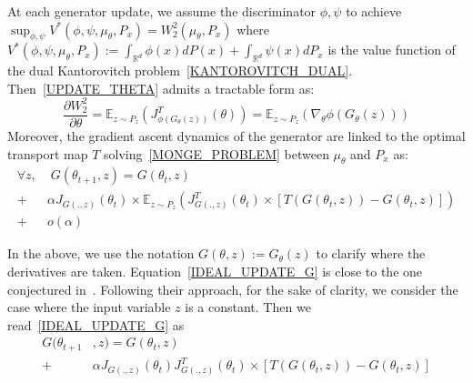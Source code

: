 \documentclass[runningheads]{llncs}
\newcommand\mycitet[1]{\cite{#1}}
\begin{document}
\begin{proposition}\label{prop:dynamic}
\normalfont At each generator update, we assume the discriminator $\phi,\psi$ to achieve $\sup_{\phi,\psi} V^*(\phi,\psi,\mu_\theta,P_x)=W_2^2(\mu_\theta,P_x)$ where $V^*(\phi,\psi,\mu_\theta,P_x):= \int_{\mathds{R}^d} \phi(x)dP(x) + \int_{\mathds{R}^d} \psi(x)dP_x$ is the value function of the dual Kantorovitch problem~\eqref{KANTOROVITCH_DUAL}. Then~\eqref{UPDATE_THETA} admits a tractable form as:
\[\frac{\partial{ W_2^2}}{\partial \theta}= \mathds{E}_{z \sim P_z}(J_{\phi(G_\theta(z))}^T (\theta))= \mathds{E}_{z\sim P_z}(\nabla_\theta \phi(G_\theta(z)))\]
Moreover, the gradient ascent dynamics of the generator are linked to the optimal transport map $T$ solving~\eqref{MONGE_PROBLEM} between $\mu_\theta$ and $P_x$ as:
\begin{align}
\forall z,& \; G(\theta_{t+1},z)= G(\theta_t,z) \nonumber \\+\; &\alpha J_{G(.,z)}(\theta_t) \times \mathds{E}_{z\sim P_z}\left( J_{G(.,z)}^T(\theta_t)\times \left[T(G(\theta_t,z))-G(\theta_t,z) \right]\right) \nonumber \\+\; &o(\alpha)
\label{IDEAL_UPDATE_G}
\end{align}
\end{proposition}
In the above, we use the notation $G(\theta,z):=G_\theta(z)$ to clarify where the derivatives are taken. Equation~\eqref{IDEAL_UPDATE_G} is close to the one conjectured in~\mycitet{lui2017implicit}. Following their approach, for the sake of clarity, we consider the case where the input variable $z$ is a constant. Then we read~\eqref{IDEAL_UPDATE_G} as 
\begin{align}
G(\theta_{t+1}&,z)= G(\theta_t,z) \nonumber \\+&\alpha J_{G(.,z)}(\theta_t)   J_{G(.,z)}^T(\theta_t)\times \left[T(G(\theta_t,z))-G(\theta_t,z) \right] 
\end{align}
\end{document}
